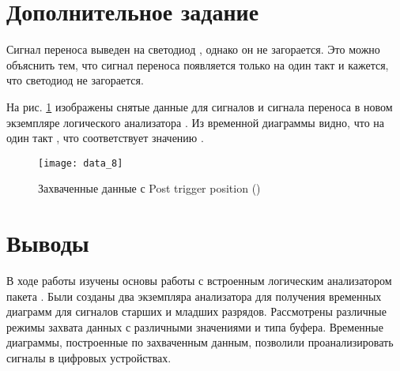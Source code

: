 \section{Дополнительное задание}

Сигнал переноса  выведен на светодиод , однако он не загорается. Это можно объяснить тем, что сигнал переноса появляется только на один такт и кажется, что светодиод не загорается.

На рис. \ref{fig:data_8} изображены снятые данные для сигналов  и сигнала переноса  в новом экземпляре логического анализатора . Из временной диаграммы видно, что на один такт , что соответствует значению .

\vspace{-0.5cm}
\begin{figure}[H]
	\begin{center}
		\texttt{[image: data\_8]}
		\caption{Захваченные данные с Post trigger position ()}
		\label{fig:data_8}
	\end{center}
\end{figure}

\section{Выводы}

В ходе работы изучены основы работы с встроенным логическим анализатором  пакета . Были созданы два экземпляра анализатора для получения временных диаграмм для сигналов старших и младших разрядов. Рассмотрены различные режимы захвата данных с различными значениями  и типа буфера. Временные диаграммы, построенные по захваченным данным, позволили проанализировать сигналы в цифровых устройствах.


